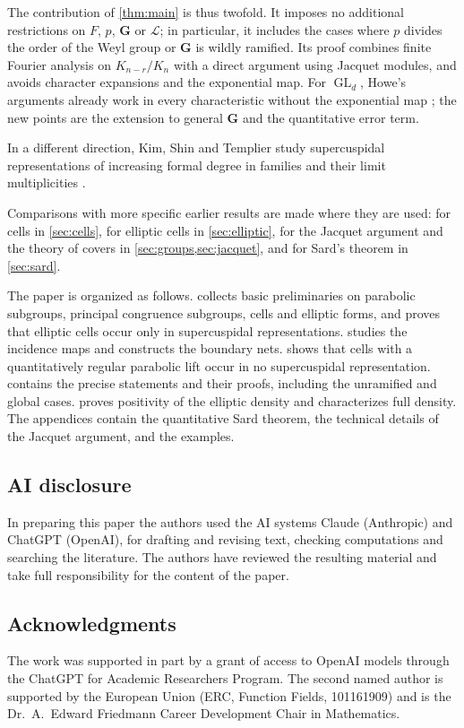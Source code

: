 \documentclass[11pt,reqno]{amsart}
\numberwithin{equation}{section}
\theoremstyle{plain}
\theoremstyle{definition}
\theoremstyle{remark}
\theoremstyle{plain}
\newcommand{\Lat}{\mathcal{L}}   %
\newcommand{\bG}{\mathbf{G}}     %
\newcommand{\g}{\mathfrak{g}}    %
\newcommand{\bnets}{boundary nets}
\DeclareMathOperator{\GL}{GL}
\begin{document}
The contribution of \cref{thm:main} is thus twofold. It imposes no
additional restrictions on $F$, $p$, $\bG$ or $\Lat$; in particular,
it includes the cases where $p$ divides the order of the Weyl group
or $\bG$ is wildly ramified. Its proof combines finite Fourier analysis
on $K_{n-r}/K_n$ with a direct argument using Jacquet modules, and
avoids character expansions and the exponential map. For $\GL_d$, Howe's
arguments already work in every characteristic without the exponential
map \cite{MR0492088}; the new points are the extension to general $\bG$
and the quantitative error term.

In a different direction, Kim, Shin and Templier
study supercuspidal representations of increasing formal degree in families
and their limit multiplicities \cite{MR4046074}.

Comparisons with more specific earlier results are made where they are
used: for cells in \cref{sec:cells}, for elliptic cells in
\cref{sec:elliptic}, for the Jacquet argument and the theory of covers in
\cref{sec:groups,sec:jacquet}, and for Sard's theorem in \cref{sec:sard}.


The paper is organized as follows.
 collects basic preliminaries on parabolic subgroups,
principal congruence subgroups, cells and elliptic forms, and proves
that elliptic cells occur only in supercuspidal representations.
 studies the incidence maps and constructs the
\bnets{}.  shows that cells with a quantitatively
regular parabolic lift occur in no supercuspidal representation.
 contains the precise statements and their proofs,
including the unramified and global cases. 
proves positivity of the elliptic density and characterizes full
density. The appendices contain the quantitative Sard theorem, the
technical details of the Jacquet argument, and the examples.

\subsection*{AI disclosure}
In preparing this paper the authors used the AI systems Claude (Anthropic)
and ChatGPT (OpenAI), for drafting and revising text, checking
computations and searching the literature. The authors have reviewed the
resulting material and take full responsibility for the content of the
paper.

\subsection*{Acknowledgments}
The work was supported in part by a grant of access to OpenAI models
through the ChatGPT for Academic Researchers Program.
The second named author is supported by the European Union (ERC, Function
Fields, 101161909) and is the Dr.~A.~Edward Friedmann Career Development
Chair in Mathematics.
\end{document}
